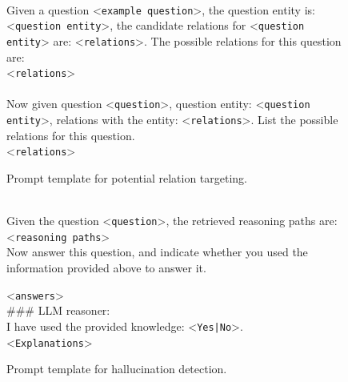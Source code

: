 \begin{figure}[!t]
\begin{tcolorbox}[colback=gray!5!white,
                  colframe=gray!75!black,
                  title=Prompt template for relation targeting]
\scriptsize

 \\ [5pt]
Given a question <\texttt{example question}>, the question entity is:<\texttt{question entity}>, the candidate relations for <\texttt{question entity}> are: <\texttt{relations}>. The possible relations for this question are: \\[5pt]

<\texttt{relations}>  \\[5pt]

 \\ [5pt]

Now given question <\texttt{question}>, question entity: <\texttt{question entity}>, relations with the entity: <\texttt{relations}>. List the possible relations for this question. \\ [5pt]

<\texttt{relations}> \\ [5pt]
\end{tcolorbox}
\caption{Prompt template for potential relation targeting.}
\label{fig:get_relation_cand}
\end{figure}


\begin{figure}[!t]
\begin{tcolorbox}[colback=gray!5!white,
                  colframe=gray!75!black,
                  title=Prompt template for hallucination detection]
\scriptsize

 \\ [5pt]
Given the question <\texttt{question}>, the retrieved reasoning paths are: \\[5pt]

<\texttt{reasoning paths}>  \\[5pt]

Now answer this question, and indicate whether you used the information provided above to answer it.

<\texttt{answers}> \\ [5pt]

\#\#\# LLM reasoner:\\ [2pt]
I have used the provided knowledge: <\texttt{Yes|No}>. \\ [3pt]

<\texttt{Explanations}>
\end{tcolorbox}
\caption{Prompt template for hallucination detection.}
\label{fig:hallucination_detect}
\end{figure}

